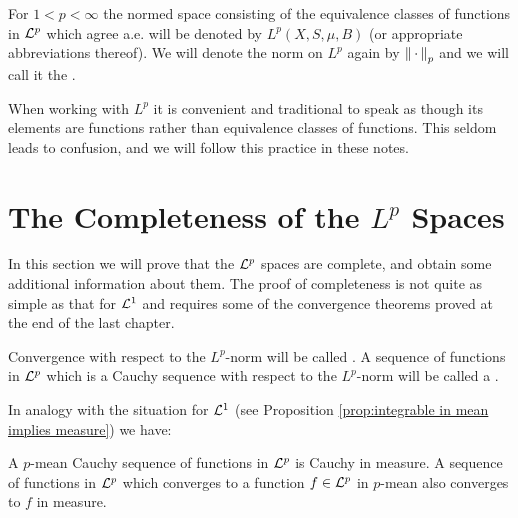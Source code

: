 \begin{definition}
For $1<p<\infty$ the normed space consisting of the equivalence classes of functions in ${\cal L}^p$ which agree a.e. will be denoted by $L^p(X,S,\mu,B)$ (or appropriate abbreviations thereof). We will denote the norm on $L^p$ again by $\norm{\,\cdot\,}_p$ and we will call it the .
\end{definition}

When working with $L^p$ it is convenient and traditional to speak as though its elements are functions rather than equivalence classes of functions. This seldom leads to confusion, and we will follow this practice in these notes.

\section{The Completeness of the \texorpdfstring{$L^p$}{Lp} Spaces}

In this section we will prove that the ${\cal L}^p$ spaces are complete, and obtain some additional information about them. The proof of completeness is not quite as simple as that for ${\cal L}^1$ and requires some of the convergence theorems proved at the end of the last chapter.

\begin{definition}
Convergence with respect to the $L^p$-norm will be called . A sequence of functions in ${\cal L}^p$ which is a Cauchy sequence with respect to the $L^p$-norm will be called a .
\end{definition}

In analogy with the situation for ${\cal L}^1$ (see Proposition \ref{prop:integrable in mean implies measure}) we have:

\begin{proposition}\label{prop:p mean implies in measure}
A $p$-mean Cauchy sequence of functions in ${\cal L}^p$ is Cauchy in measure. A sequence of functions in ${\cal L}^p$ which converges to a function $f\in{\cal L}^p$ in $p$-mean also converges to $f$ in measure.
\end{proposition}

